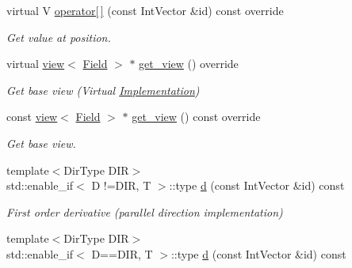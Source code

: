 \begin{DoxyCompactItemize}
virtual V \hyperlink{classUintah_1_1PhaseField_1_1detail_1_1bc__fd_3_01ScalarField_3_01T_01_4_00_01STN_00_01CC_00_01Fa77b2fd7fb77d0a4dc6c86c68d4ea0bc_a83bd04bf932ebbe064ac01bae98d7227}{operator\mbox{[}$\,$\mbox{]}} (const Int\+Vector \&id) const override
\begin{DoxyCompactList}\small\item\em Get value at position. \end{DoxyCompactList}\item 
virtual \hyperlink{classUintah_1_1PhaseField_1_1detail_1_1view}{view}$<$ \hyperlink{structUintah_1_1PhaseField_1_1ScalarField}{Field} $>$ $\ast$ \hyperlink{classUintah_1_1PhaseField_1_1detail_1_1bc__fd_3_01ScalarField_3_01T_01_4_00_01STN_00_01CC_00_01Fa77b2fd7fb77d0a4dc6c86c68d4ea0bc_ab7b39dfca20ca18356b1a72ae055e99f}{get\+\_\+view} () override
\begin{DoxyCompactList}\small\item\em Get base view (Virtual \hyperlink{classUintah_1_1PhaseField_1_1Implementation}{Implementation}) \end{DoxyCompactList}\item 
const \hyperlink{classUintah_1_1PhaseField_1_1detail_1_1view}{view}$<$ \hyperlink{structUintah_1_1PhaseField_1_1ScalarField}{Field} $>$ $\ast$ \hyperlink{classUintah_1_1PhaseField_1_1detail_1_1bc__fd_3_01ScalarField_3_01T_01_4_00_01STN_00_01CC_00_01Fa77b2fd7fb77d0a4dc6c86c68d4ea0bc_a2199408e573e0a6f2cd86bb7fbd002a7}{get\+\_\+view} () const override
\begin{DoxyCompactList}\small\item\em Get base view. \end{DoxyCompactList}\item 
{\footnotesize template$<$Dir\+Type D\+IR$>$ }\\std\+::enable\+\_\+if$<$ D !=D\+IR, T $>$\+::type \hyperlink{classUintah_1_1PhaseField_1_1detail_1_1bc__fd_3_01ScalarField_3_01T_01_4_00_01STN_00_01CC_00_01Fa77b2fd7fb77d0a4dc6c86c68d4ea0bc_af5f6c1e347ff1106dd15643c8346fe46}{d} (const Int\+Vector \&id) const
\begin{DoxyCompactList}\small\item\em First order derivative (parallel direction implementation) \end{DoxyCompactList}\item 
{\footnotesize template$<$Dir\+Type D\+IR$>$ }\\std\+::enable\+\_\+if$<$ D==D\+IR, T $>$\+::type \hyperlink{classUintah_1_1PhaseField_1_1detail_1_1bc__fd_3_01ScalarField_3_01T_01_4_00_01STN_00_01CC_00_01Fa77b2fd7fb77d0a4dc6c86c68d4ea0bc_a139958f277e857c56d230179e31e4246}{d} (const Int\+Vector \&id) const

\end{DoxyCompactItemize}
